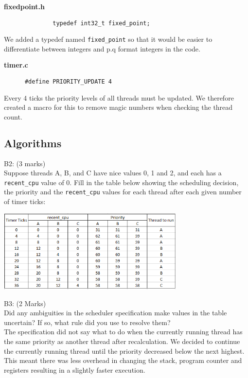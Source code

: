 \documentclass[11pt, a4paper]{article}
\begin{document}
		\begin{center}
      \textbf{fixedpoint.h}
    \end{center}
		\begin{verbatim}
		      typedef int32_t fixed_point;
		\end{verbatim}
		We added a typedef named \verb|fixed_point| so that it would be easier to differentiate between integers and p.q format integers in the code.
		
    \begin{center}
      \textbf{timer.c}
    \end{center}
		\begin{verbatim}
      #define PRIORITY_UPDATE 4
    \end{verbatim}
		Every 4 ticks the priority levels of all threads must be updated. We therefore created a macro for this to remove magic numbers when checking the thread count.

	\subsection{Algorithms}
		B2: (3 marks)\\
		Suppose threads A, B, and C have nice values 0, 1 and 2, and each has a \verb+recent_cpu+ value 
		of 0. Fill in the table below showing the scheduling decision, the priority and the 
		\verb+recent_cpu+ values for each thread after each given number of timer ticks:
		\begin{center}
			\includegraphics[width=0.7\textwidth]{table_diagram.png}
		\end{center}
		B3: (2 Marks)\\
		Did any ambiguities in the scheduler specification make values in the table uncertain? If so, 
		what rule did you use to resolve them?\bigskip\\
		The specification did not say what to do when the currently running thread has the same priority as another thread after recalculation. We decided to continue the currently running thread until the priority decreased below the next highest. This meant there was less overhead in changing the stack, program counter and registers resulting in a slightly faster execution.
\end{document}
